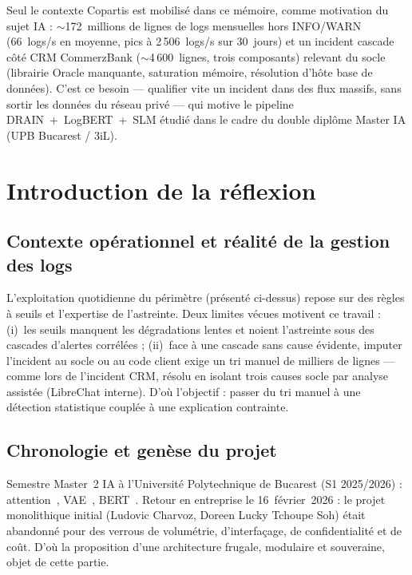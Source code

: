 \documentclass[12pt,a4paper]{report}
\begin{document}
Seul le contexte Copartis est mobilisé dans ce mémoire, comme motivation du sujet IA : $\sim$172~millions de lignes de logs mensuelles hors INFO/WARN (66~logs/s en moyenne, pics à 2\,506~logs/s sur 30~jours) et un incident cascade côté CRM CommerzBank ($\sim$4\,600~lignes, trois composants) relevant du socle (librairie Oracle manquante, saturation mémoire, résolution d'hôte base de données). C'est ce besoin --- qualifier vite un incident dans des flux massifs, sans sortir les données du réseau privé --- qui motive le pipeline DRAIN~+~LogBERT~+~SLM étudié dans le cadre du double diplôme Master IA (UPB Bucarest / 3iL).

\section{Introduction de la réflexion}

\subsection{Contexte opérationnel et réalité de la gestion des logs}

L'exploitation quotidienne du périmètre (présenté ci-dessus) repose sur des règles à seuils et l'expertise de l'astreinte. Deux limites vécues motivent ce travail : (i)~les seuils manquent les dégradations lentes et noient l'astreinte sous des cascades d'alertes corrélées ; (ii)~face à une cascade sans cause évidente, imputer l'incident au socle ou au code client exige un tri manuel de milliers de lignes --- comme lors de l'incident CRM, résolu en isolant trois causes socle par analyse assistée (LibreChat interne). D'où l'objectif : passer du tri manuel à une détection statistique couplée à une explication contrainte.

\subsection{Chronologie et genèse du projet}

Semestre Master~2 IA à l'Université Polytechnique de Bucarest (S1 2025/2026) : attention~\cite{vaswani2017attention}, VAE~\cite{kingma2013vae}, BERT~\cite{devlin2018bert}. Retour en entreprise le 16~février~2026 : le projet monolithique initial (Ludovic Charvoz, Doreen Lucky Tchoupe Soh) était abandonné pour des verrous de volumétrie, d'interfaçage, de confidentialité et de coût. D'où la proposition d'une architecture frugale, modulaire et souveraine, objet de cette partie.
\end{document}
